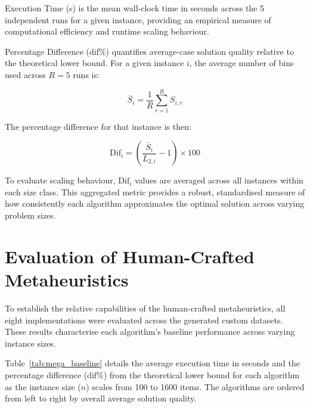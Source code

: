 \documentclass[11pt]{article}
\begin{document}
Execution Time (s) is the mean wall-clock time in seconds across 
the 5 independent runs for a given instance, providing an empirical 
measure of computational efficiency and runtime scaling behaviour.

Percentage Difference (dif\%) quantifies average-case solution quality relative to the theoretical lower bound. For a given instance $i$, the average number of bins used across $R = 5$ runs is:

\begin{equation}
    \bar{S}_i = \frac{1}{R} \sum_{r=1}^{R} S_{i,r}
\end{equation}

The percentage difference for that instance is then:

\begin{equation}
    \text{Dif}_i = \left( \frac{\bar{S}_i}{L_{2,i}} - 1 \right) \times 100
\end{equation}

To evaluate scaling behaviour, $\text{Dif}_i$ values are averaged across all
instances within each size class. This aggregated metric provides a 
robust, standardised measure of how consistently each algorithm 
approximates the optimal solution across varying problem sizes.

\section{Evaluation of Human-Crafted Metaheuristics \label{sec:human_eval}}

To establish the relative capabilities of the human-crafted metaheuristics, all eight
implementations were evaluated across the generated custom datasets. These results
characterise each algorithm's baseline performance across varying instance sizes.

Table~\ref{tab:mega_baseline} details the average execution time in seconds and the 
percentage difference (dif\%) from the theoretical lower bound for each algorithm as the 
instance size ($n$) scales from 100 to 1600 items. The algorithms are ordered from left 
to right by overall average solution quality.
\end{document}
